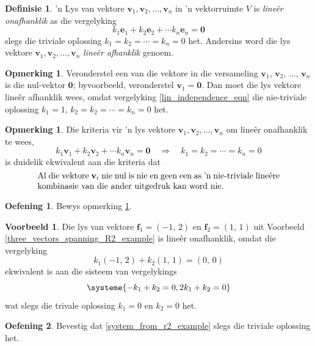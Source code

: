 \documentclass[a4paper,11pt]{book}
\theoremstyle{definition}
\newtheorem{definition}[theorem]{Definisie}
\newtheorem{exercise}{Oefening}
\newtheorem{example_environment}{Voorbeeld}[chapter]
\newtheorem{remark}[theorem]{Opmerking}
\newcommand{\be}{\begin{equation}}
\newcommand{\ee}{\end{equation}}
\newcommand{\ve}[1]{\mathbf{#1}}
\newenvironment{example}
	{
		\begin{oframed}
		\begin{example_environment}
	}
	{
		\end{example_environment}
		\end{oframed}
	}
\begin{document}
\begin{definition} 'n Lys van vektore $\ve{v}_1, \ve{v}_2, \ldots,
	\ve{v}_n$ in 'n vektorruimte $V$ is \emph{line{\^e}r onafhanklik} as
	die vergelyking
	\be \label{lin_independence_eqn}
	k_1 \ve{e}_1 + k_2 \ve{e}_2 + \cdots k_n \ve{e}_n = \ve{0}
	\ee
	slegs die triviale oplossing $k_1 = k_2 = \cdots = k_n = 0$ het.
	Andersins word die lys vektore $\ve{v}_1, \ve{v}_2, \ldots, \ve{v}_n$
	\emph{line{\^e}r afhanklik} genoem.
\end{definition}
\begin{remark} Veronderstel een van die vektore in die versameling
	$\ve{v}_1$, $\ve{v}_2$, $\ldots$, $\ve{v}_n$ is die nul-vektor
	$\ve{0}$; byvoorbeeld, veronderstel $\ve{v}_1 = \ve{0}$. Dan moet die
	lys vektore line{\^e}r afhanklik wees, omdat vergelyking
	\eqref{lin_independence_eqn} die nie-triviale oplossing $k_1 = 1$, $k_2
	= k_2 = \cdots = k_n = 0$ het. \label{remark_about_lin_dependence}
\end{remark}

\begin{remark}
	\label{crit_ind} Die kriteria vir 'n lys vektore $\ve{v}_1, \ve{v}_2,
	\ldots, \ve{v}_n$ om line{\^e}r onafhanklik te wees,
	\[
		k_1 \ve{v}_1 + k_2 \ve{v}_2 + \cdots k_n \ve{v}_n = \ve{0} \quad
		\Rightarrow \quad k_1 = k_2 = \cdots = k_n = 0
	\]
	is duidelik ekwivalent aan die kriteria dat
	\[
		\begin{minipage}{10cm} 
			{ 
			Al die vektore $\ve{v}_i$ nie nul is nie en geen een as 'n
			nie-triviale line{\^e}re kombinasie van die ander uitgedruk kan
			word nie.
			}
		\end{minipage}
	\]
\end{remark}
\begin{exercise}
	Bewys opmerking \ref{crit_ind}.
\end{exercise}

\begin{example} Die lys van vektore $\ve{f}_1 = (-1, \, 2)$ en $\ve{f}_2 =
	(1, \,1)$ uit Voorbeeld \ref{three_vectors_spanning_R2_example} is
	line{\^e}r onafhanklik, omdat die vergelyking
	\[
		k_1 (-1, \, 2) + k_2 (1, \, 1) = (0, \, 0)
	\]
	ekwivalent is aan die sisteem van vergelykings
	\be \label{system_from_r2_example}
	\systeme{-k_1 + k_2 = 0, 2k_1 + k_2 = 0}
	\ee
	wat slegs die trivale oplossing $k_1 = 0$ en $k_2 = 0$ het.
	\begin{exercise} Bevestig dat \eqref{system_from_r2_example} slegs die
		triviale oplossing het.
	\end{exercise}
\end{example}
\end{document}
